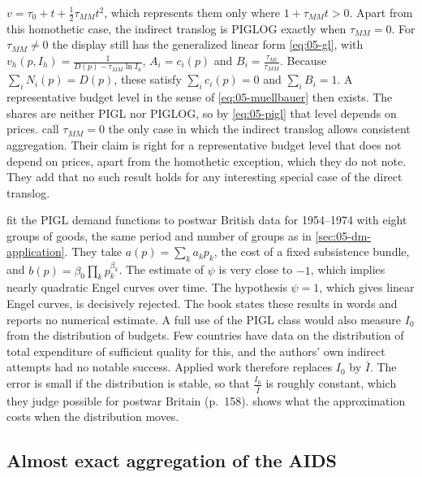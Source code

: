 \begin{remark}
$v = \tau_0 + t + \frac{1}{2}\tau_{MM}t^2$, which represents them only where $1 + \tau_{MM}t > 0$.
Apart from this homothetic case, the indirect translog is PIGLOG exactly when $\tau_{MM} = 0$. For
$\tau_{MM} \neq 0$ the display still has the generalized linear form \eqref{eq:05-gl}, with
$v_h(p, I_h) = \frac{1}{D(p) - \tau_{MM}\ln I_h}$, $A_i = c_i(p)$ and $B_i = \frac{\tau_{Mi}}{\tau_{MM}}$.
Because $\sum_i N_i(p) = D(p)$, these satisfy $\sum_i c_i(p) = 0$ and $\sum_i B_i = 1$. A
representative budget level in the sense of \eqref{eq:05-muellbauer} then exists. The shares are
neither PIGL nor PIGLOG, so by \eqref{eq:05-pigl} that level depends on prices.
\citet[p.~325, eqs.~A11--A12]{DeatonMuellbauer1980a} call $\tau_{MM} = 0$ the only case in which the
indirect translog allows consistent aggregation. Their claim is right for a representative budget level
that does not depend on prices, apart from the homothetic exception, which they do not note. They add
that no such result holds for any interesting special case of the direct translog.
\end{remark}

\citet[\S 6.2, p.~158]{DeatonMuellbauer1980b} fit the PIGL demand functions to postwar British data for
1954--1974 with eight groups of goods, the same period and number of groups as in
\cref{sec:05-dm-application}. They take $a(p) = \sum_k
a_kp_k$, the cost of a fixed subsistence bundle, and $b(p) = \beta_0\prod_k p_k^{\beta_k}$. The estimate of
$\psi$ is very close to $-1$, which implies nearly quadratic Engel curves over time. The hypothesis $\psi =
1$, which gives linear Engel curves, is decisively rejected. The book states these results in words and
reports no numerical estimate. A full use of the PIGL class would also measure $I_0$ from the
distribution of budgets. Few countries have data on the distribution of total expenditure of sufficient
quality for this, and the authors' own indirect attempts had no notable success. Applied work therefore
replaces $I_0$ by $\bar I$. The error is small if the distribution is stable, so that $\frac{I_0}{\bar I}$
is roughly constant, which they judge possible for postwar Britain (p.~158).
 shows what the approximation costs when the distribution moves.

\subsection{Almost exact aggregation of the AIDS}\label{sec:05-almost-exact}

